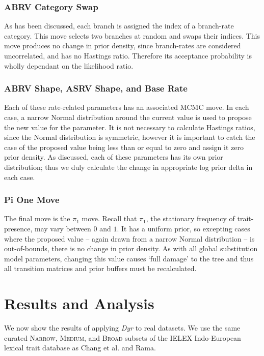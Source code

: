 \documentclass[10pt,journal,compsoc]{IEEEtran}
\begin{document}
\subsubsection{ABRV Category Swap}

As has been discussed, each branch is assigned the index of a branch-rate category. This move selects two branches at random and swaps their indices. This move produces no change in prior density, since branch-rates are considered uncorrelated, and has no Hastings ratio. Therefore its acceptance probability is wholly dependant on the likelihood ratio.

\subsubsection{ABRV Shape, ASRV Shape, and Base Rate}

Each of these rate-related parameters has an associated MCMC move. In each case, a narrow Normal distribution around the current value is used to propose the new value for the parameter. It is not necessary to calculate Hastings ratios, since the Normal distribution is symmetric, however it is important to catch the case of the proposed value being less than or equal to zero and assign it zero prior density. As discussed, each of these parameters has its own prior distribution; thus we duly calculate the change in appropriate log prior delta in each case.

\subsubsection{Pi One Move}

The final move is the $\pi_1$ move. Recall that $\pi_1$, the stationary frequency of trait-presence, may vary between $0$ and $1$. It has a uniform prior, so excepting cases where the proposed value -- again drawn from a narrow Normal distribution -- is out-of-bounds, there is no change in prior density. As with all global substitution model parameters, changing this value causes `full damage' to the tree and thus all transition matrices and prior buffers must be recalculated.

\section{Results and Analysis}\label{sec:results}

We now show the results of applying \textit{Dyr} to real datasets. We use the same curated \textsc{Narrow}, \textsc{Medium}, and \textsc{Broad} subsets of the IELEX Indo-European lexical trait database as Chang et al. and Rama.
\end{document}
